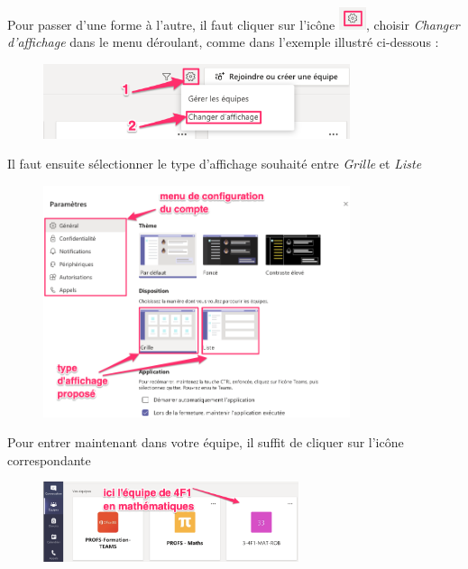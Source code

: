 Pour passer d'une forme à l'autre, il faut cliquer sur l'icône \includegraphics[width=0.8cm]{./images/teams/bouton_parametres}, choisir \textit{Changer d'affichage} dans le menu déroulant, comme dans l'exemple illustré ci-dessous :

\begin{figure}[H]
\includegraphics[width=9cm]{./images/teams/changement_liste}
\centering
\end{figure}

Il faut ensuite sélectionner le type d'affichage souhaité entre \textit{Grille} et \textit{Liste}

\begin{figure}[H]
\includegraphics[width=9cm]{./images/teams/choix_parametre}
\centering
\end{figure}

 Pour entrer maintenant dans votre équipe, il suffit de cliquer sur l'icône correspondante

\begin{figure}[H]
\includegraphics[width=7.5cm]{./images/teams/entree_classe}
\centering
\end{figure}

